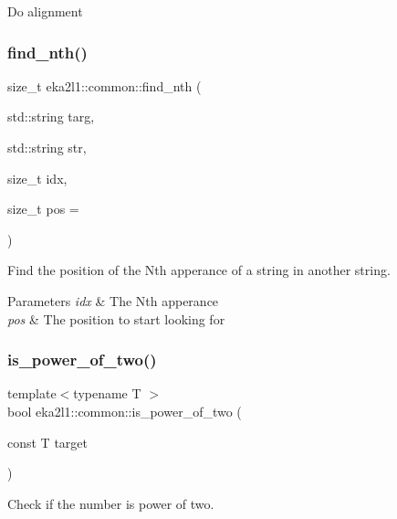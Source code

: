 Do alignment \mbox{\label{namespaceeka2l1_1_1common_a925009c74de9e04482d9dc2caca9f667}} 
\subsubsection{\texorpdfstring{find\+\_\+nth()}{find\_nth()}}
{\footnotesize\ttfamily size\+\_\+t eka2l1\+::common\+::find\+\_\+nth (\begin{DoxyParamCaption}\item[{std\+::string}]{targ,  }\item[{std\+::string}]{str,  }\item[{size\+\_\+t}]{idx,  }\item[{size\+\_\+t}]{pos = {} }\end{DoxyParamCaption})}



Find the position of the Nth apperance of a string in another string. 


\begin{DoxyParams}{Parameters}
{\em idx} & The Nth apperance \\
\hline
{\em pos} & The position to start looking for \\
\hline
\end{DoxyParams}
\mbox{\label{namespaceeka2l1_1_1common_a7825dab8c5ad388be0dc67236915e218}} 
\subsubsection{\texorpdfstring{is\+\_\+power\+\_\+of\+\_\+two()}{is\_power\_of\_two()}}
{\footnotesize\ttfamily template$<$typename T $>$ \\
bool eka2l1\+::common\+::is\+\_\+power\+\_\+of\+\_\+two (\begin{DoxyParamCaption}\item[{const T}]{target }\end{DoxyParamCaption})}

Check if the number is power of two. \mbox{\label{namespaceeka2l1_1_1common_a1985e07bb15ce95c29ed2d4bc67361d8}} 
